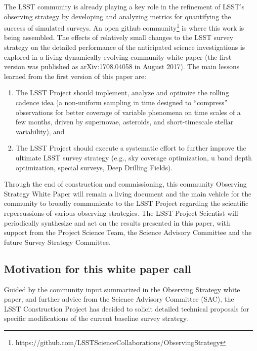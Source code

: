 \documentclass[DM,lsstdraft,toc,usenatbib]{lsstdoc}
\begin{document}
The LSST community is already playing a key role in the refinement of LSST's observing strategy 
by developing and analyzing metrics for quantifying the success of simulated surveys.
An open github community\footnote{
https://github.com/LSSTScienceCollaborations/ObservingStrategy}
is where this work is being assembled. The effects of relatively small changes to the LSST survey strategy
on the detailed performance of the anticipated science investigations 
is explored in a living dynamically-evolving community white paper (the first
version was published as arXiv:1708.04058 in August 2017). The main lessons 
learned from the first version of this paper are: 
\begin{enumerate} 
\item The LSST Project should implement, analyze and optimize the rolling cadence idea
(a non-uniform sampling in time designed to ``compress'' observations for better coverage
of variable phenomena on time scales of a few months, driven by supernovae, asteroids, and
short-timescale stellar variability), and 
\item The LSST Project should execute a systematic effort to further improve the ultimate
LSST survey strategy (e.g., sky coverage optimization, u band depth optimization, special 
surveys, Deep Drilling Fields). 
\end{enumerate} 

Through the end of construction and commissioning, this community Observing Strategy 
White Paper will remain a living document and the main vehicle for the community to broadly 
communicate to the LSST Project regarding the scientific repercussions of various observing strategies. The LSST Project Scientist will 
periodically synthesize and act on the results presented in this paper, with support from the 
Project Science Team, the Science Advisory Committee and the future Survey Strategy Committee.


\subsection{Motivation for this white paper call}

Guided by the community input summarized in the Observing Strategy white paper, and further 
advice from the Science Advisory Committee (SAC), the LSST Construction Project has decided to
solicit detailed technical proposals for specific modifications of the current baseline survey strategy.
\end{document}
